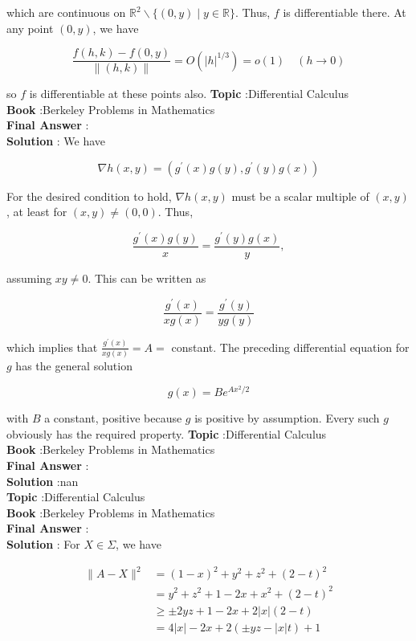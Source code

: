\documentclass[10pt]{article}
\begin{document}
which are continuous on $\mathbb{R}^{2} \backslash\{(0, y) \mid y \in \mathbb{R}\}$. Thus, $f$ is differentiable there. At any point $(0, y)$, we have

$$
\frac{f(h, k)-f(0, y)}{\|(h, k)\|}=O\left(|h|^{1 / 3}\right)=o(1) \quad(h \rightarrow 0)
$$

so $f$ is differentiable at these points also.
\textbf{Topic} :Differential Calculus \\
\textbf{Book} :Berkeley Problems in Mathematics\\
\textbf{Final Answer} :\\


\textbf{Solution} : We have

$$
\nabla h(x, y)=\left(g^{\prime}(x) g(y), g^{\prime}(y) g(x)\right)
$$

For the desired condition to hold, $\nabla h(x, y)$ must be a scalar multiple of $(x, y)$, at least for $(x, y) \neq(0,0)$. Thus,

$$
\frac{g^{\prime}(x) g(y)}{x}=\frac{g^{\prime}(y) g(x)}{y},
$$

assuming $x y \neq 0$. This can be written as

$$
\frac{g^{\prime}(x)}{x g(x)}=\frac{g^{\prime}(y)}{y g(y)}
$$

which implies that $\frac{g^{\prime}(x)}{x g(x)}=A=$ constant. The preceding differential equation for $g$ has the general solution

$$
g(x)=B e^{A x^{2} / 2}
$$

with $B$ a constant, positive because $g$ is positive by assumption. Every such $g$ obviously has the required property.
\textbf{Topic} :Differential Calculus \\
\textbf{Book} :Berkeley Problems in Mathematics\\
\textbf{Final Answer} :\\


\textbf{Solution} :nan\\
\textbf{Topic} :Differential Calculus \\
\textbf{Book} :Berkeley Problems in Mathematics\\
\textbf{Final Answer} :\\


\textbf{Solution} : For $X \in \Sigma$, we have

$$
\begin{aligned}
\|A-X\|^{2} &=(1-x)^{2}+y^{2}+z^{2}+(2-t)^{2} \\
&=y^{2}+z^{2}+1-2 x+x^{2}+(2-t)^{2} \\
& \geqslant \pm 2 y z+1-2 x+2|x|(2-t) \\
&=4|x|-2 x+2(\pm y z-|x| t)+1
\end{aligned}
$$
\end{document}
